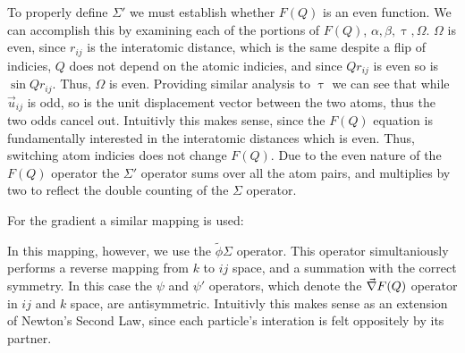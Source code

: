 To properly define $\Sigma'$ we must establish whether $F(Q)$ is an even function.  
We can accomplish this by examining each of the portions of $F(Q)$, $\alpha, \beta ,\uptau, \Omega$.
$\Omega$ is even, since $r_{ij}$ is the interatomic distance, which is the same despite a flip of indicies, $Q$ does not depend on the atomic indicies, and since $Qr_{ij}$ is even so is $\sin{Qr_{ij}}$.  Thus, $\Omega$ is even.  Providing similar analysis to $\uptau$ we can see that while $\vec{u}_{ij}$ is odd, so is the unit displacement vector between the two atoms, thus the two odds cancel out.
Intuitivly this makes sense, since the $F(Q)$ equation is fundamentally interested in the interatomic distances which is even.  Thus, switching atom indicies does not change $F(Q)$.
Due to the even nature of the $F(Q)$ operator the $\Sigma'$ operator sums over all the atom pairs, and multiplies by two to reflect the double counting of the $\Sigma$ operator.

For the gradient a similar mapping is used:
\begin{figure}[h!]
\begin{center}
\end{center}
\end{figure}

In this mapping, however, we use the $\tilde{\phi}\Sigma$ operator.  This operator simultaniously performs a reverse mapping from $k$ to $ij$ space, and a summation with the correct symmetry.  In this case the $\psi$ and $\psi'$ operators, which denote the $\vec{\nabla} F(Q)$ operator in $ij$ and $k$ space, are antisymmetric.  Intuitivly this makes sense as an extension of Newton's Second Law, since each particle's interation is felt oppositely by its partner.
